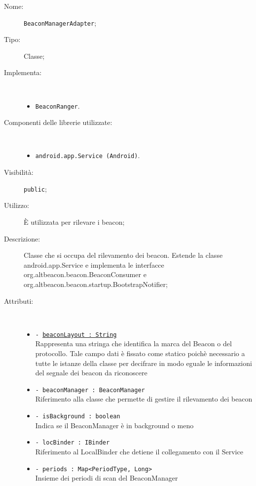 \documentclass[../DefinizioneDiProdotto.tex]{subfiles}
\begin{document}
\begin{description}
	\item[Nome:] \texttt{BeaconManagerAdapter};
	\item[Tipo:] Classe;
	\item[Implementa:] \
	\begin{itemize}
		\item \texttt{BeaconRanger}.
		
	\end{itemize}
	\item[Componenti delle librerie utilizzate:] \
	\begin{itemize}
		\item \texttt{android.app.Service (Android)}.
		
	\end{itemize}
	\item[Visibilità:] \texttt{public};
	\item[Utilizzo:] È utilizzata per rilevare i beacon;
	\item[Descrizione:] Classe che si occupa del rilevamento dei beacon. Estende la classe android.app.Service e implementa le interfacce org.altbeacon.beacon.BeaconConsumer e org.altbeacon.beacon.startup.BootstrapNotifier;
	\item[Attributi:] \
	\begin{itemize}
		\item \texttt{- \underline{beaconLayout : String}}\\
		Rappresenta una stringa che identifica la marca del Beacon o del protocollo. Tale campo dati è fissato come statico poichè necessario a tutte le istanze della classe per decifrare in modo eguale le informazioni del segnale dei beacon da riconoscere
		
		\item \texttt{- beaconManager : BeaconManager}\\
		Riferimento alla classe che permette di gestire il rilevamento dei beacon
		
		\item \texttt{- isBackground : boolean}\\
		Indica se il BeaconManager è in background o meno
		
		\item \texttt{- locBinder : IBinder}\\
		Riferimento al LocalBinder che detiene il collegamento con il Service
		
		\item \texttt{- periods : Map<PeriodType, Long>}\\
		Insieme dei periodi di scan del BeaconManager
		

\end{itemize}
\end{description}
\end{document}
